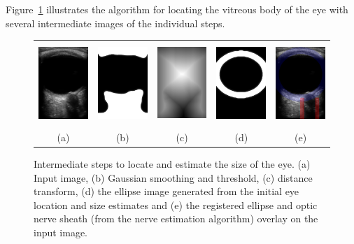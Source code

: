 \documentclass{llncs}
\begin{document}
Figure~\ref{fig:algorithm-eye} illustrates the algorithm for locating the
vitreous body of the eye with several intermediate images of the individual
steps. 
\begin{figure}
\centering
\begin{tabular}{ccccc}
\includegraphics[height=1.22in]{019.png} &
\includegraphics[height=1.22in]{019-eye-smooth.png} &
\includegraphics[height=1.22in]{019-eye-distance.png} &         
\includegraphics[height=1.22in]{019-eye-moving.png} &
\includegraphics[height=1.22in]{019-overlay.png}\\
(a) & (b) & (c) & (d) & (e)
\end{tabular}
\caption{
\label{fig:algorithm-eye}
Intermediate steps to locate and estimate the size of the eye. (a) Input image,
(b) Gaussian smoothing and threshold, (c) distance transform, (d) the ellipse
image generated from the initial eye location and size estimates and (e) the
registered ellipse and optic nerve sheath (from the nerve estimation algorithm)
overlay on the input image.
}
\end{figure}
\end{document}
